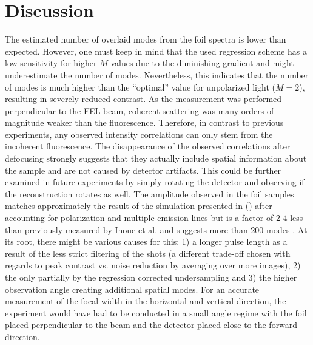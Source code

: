 \section{Discussion}
The estimated number of overlaid modes from the foil spectra is lower than expected. However, one must keep in mind that the used regression scheme has a low sensitivity for higher $M$ values due to the diminishing gradient and might underestimate the number of modes. Nevertheless, this indicates that the number of modes is much higher than the \enquote{optimal} value for unpolarized light ($M=2$), resulting in severely reduced contrast. 
As the measurement was performed perpendicular to the FEL beam, coherent scattering was many orders of magnitude weaker than the fluorescence.  Therefore, in contrast to previous experiments, any observed intensity correlations can only stem from the incoherent fluorescence.
The disappearance of the observed correlations after defocusing strongly suggests that they actually include spatial information about the sample and are not caused by detector artifacts. This could be further examined in future experiments by simply rotating the detector and observing if the reconstruction rotates as well. The amplitude observed in the foil samples matches approximately the result of the simulation presented in   () after accounting for polarization and multiple emission lines but is a factor of 2-4 less than previously measured by Inoue et al. and suggests more than 200 modes \cite{inoue2019}. At its root, there might be various causes for this: 1) a longer pulse length as a result of the less strict filtering of the shots (a different trade-off chosen with regards to peak contrast vs. noise reduction by averaging over more images), 2) the only partially by the regression corrected undersampling and 3) the higher observation angle creating additional spatial modes. For an accurate measurement of the focal width in the horizontal and vertical direction, the experiment would have had to be conducted in a small angle regime with the foil placed perpendicular to the beam and the detector placed close to the forward direction. 

